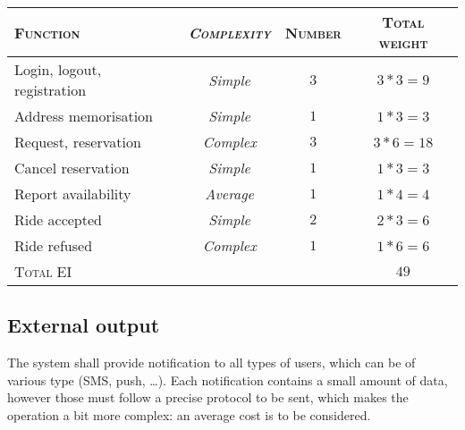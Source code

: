 \begin{table*}\begin{tabularx}{\textwidth}{ X >{\itshape}C{\myWFP} C{\myWFP} C{\myWFP} }

\toprule
	
	\normalfont\textsc{Function} &
	\normalfont\textsc{Complexity}	& 
	\normalfont\textsc{Number} &
	\normalfont\textsc{Total weight} \\

\toprule

	Login, logout, registration	& Simple		& $ 3 $		& $ 3*3 = 9 $ \\
\midrule
	Address memorisation			& Simple		& $ 1 $		& $ 1*3 = 3 $ \\
\midrule
	Request, reservation			& Complex	& $ 3 $		& $ 3*6 = 18 $ \\
\midrule
	Cancel reservation			& Simple		& $ 1 $ 		& $ 1*3 = 3 $ \\
\midrule
	Report availability			& Average	& $ 1 $ 		& $ 1*4 = 4 $ \\
\midrule
	Ride accepted				& Simple		& $ 2 $ 		& $ 2*3 = 6 $ \\
\midrule
	Ride refused				& Complex	& $ 1 $ 		& $ 1*6 = 6 $ \\

\bottomrule

\normalfont\textsc{Total} EI && & $ 49 $ \\

\bottomrule


\end{tabularx}\end{table*}










\subsection*{External output}


The system shall provide notification to all types of users, which can be of various type (SMS, push, \dots). Each notification contains a small amount of data, however those must follow a precise protocol to be sent, which makes the operation a bit more complex: an average cost is to be considered.



